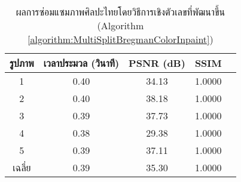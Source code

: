 \begin{table}[H]
    \centering
    \begin{tabular}[ht]{|c|c|c|c|c|}
        \hline
        รูปภาพ &เวลาประมวล  (วินาที) & PSNR (dB) & SSIM \\
        \hline
        1 & 0.40 & 34.13 & 1.0000 \\ 
        2 & 0.40 & 38.18 & 1.0000 \\
        3 &  0.39 & 37.73 & 1.0000 \\
        4 & 0.38  & 29.38  & 1.0000 \\
        5 & 0.39  & 37.11  & 1.0000 \\
        \hline
        เฉลี่ย & 0.39  & 35.30  & 1.0000 \\
        \hline
    \end{tabular}
    \caption{ผลการซ่อมแซมภาพศิลปะไทยโดยวิธีการเชิงตัวเลขที่พัฒนาขึ้น (Algorithm \ref{algorithm:MultiSplitBregmanColorInpaint})}
    \label{table:ex4-multiresolution}
\end{table}	 